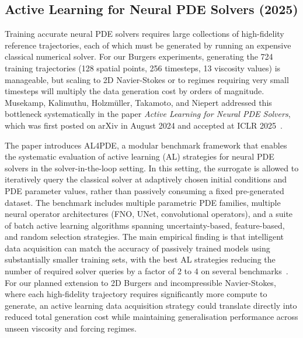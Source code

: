 \subsection{Active Learning for Neural PDE Solvers (2025)}
\label{sec:bg:active-learning}

Training accurate neural PDE solvers requires large collections of high-fidelity reference trajectories, each of which must be generated by running an expensive classical numerical solver. For our Burgers experiments, generating the 724 training trajectories (128 spatial points, 256 timesteps, 13 viscosity values) is manageable, but scaling to 2D Navier-Stokes or to regimes requiring very small timesteps will multiply the data generation cost by orders of magnitude. Musekamp, Kalimuthu, Holzmüller, Takamoto, and Niepert addressed this bottleneck systematically in the paper \emph{Active Learning for Neural PDE Solvers}, which was first posted on arXiv in August 2024 and accepted at ICLR 2025~\cite{musekamp2025activelearning}.

The paper introduces AL4PDE, a modular benchmark framework that enables the systematic evaluation of active learning (AL) strategies for neural PDE solvers in the solver-in-the-loop setting. In this setting, the surrogate is allowed to iteratively query the classical solver at adaptively chosen initial conditions and PDE parameter values, rather than passively consuming a fixed pre-generated dataset. The benchmark includes multiple parametric PDE families, multiple neural operator architectures (FNO, UNet, convolutional operators), and a suite of batch active learning algorithms spanning uncertainty-based, feature-based, and random selection strategies. The main empirical finding is that intelligent data acquisition can match the accuracy of passively trained models using substantially smaller training sets, with the best AL strategies reducing the number of required solver queries by a factor of 2 to 4 on several benchmarks~\cite{musekamp2025activelearning}. For our planned extension to 2D Burgers and incompressible Navier-Stokes, where each high-fidelity trajectory requires significantly more compute to generate, an active learning data acquisition strategy could translate directly into reduced total generation cost while maintaining generalisation performance across unseen viscosity and forcing regimes.

